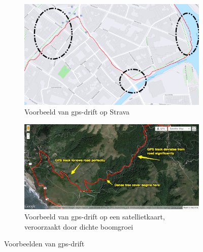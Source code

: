 \begin{figure}[h]
    \centering
    \begin{subfigure}[b]{.45\textwidth}
        \centering
        \includegraphics[width=\textwidth]{fig/Afwijkingen&Analyses/Crooked Routes/GPS-drift.png}
        \caption{Voorbeeld van gps-drift op Strava}\label{fig:gps_drift_Strava}
    \end{subfigure}\hfill
    \begin{subfigure}[b]{.49\textwidth}
        \centering
        \includegraphics[width=\textwidth]{fig/Afwijkingen&Analyses/Crooked Routes/GPS-Drift_onlnie.jpg}
        \caption{Voorbeeld van gps-drift op een satellietkaart, veroorzaakt door dichte boomgroei~\cite{BadGPSDa19:online}}
    \end{subfigure}
    \caption{Voorbeelden van gps-drift}
\end{figure}

